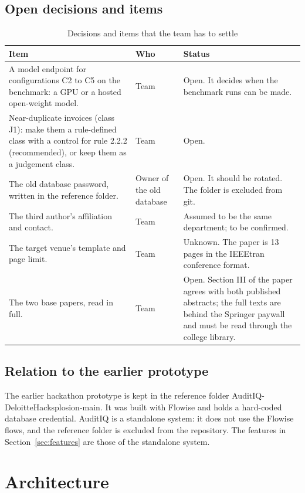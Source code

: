 \documentclass[11pt,a4paper]{article}
\begin{document}
\subsection{Open decisions and items}
\begin{table}[htbp]
\caption{Decisions and items that the team has to settle}
\label{tab:open}
\centering
\small
\begin{tabular}{L{6.2cm}L{3.0cm}L{6.1cm}}
\toprule
Item & Who & Status \\
\midrule
A model endpoint for configurations C2 to C5 on the benchmark: a GPU or a hosted open-weight model. & Team & Open. It decides when the benchmark runs can be made. \\
Near-duplicate invoices (class J1): make them a rule-defined class with a control for rule 2.2.2 (recommended), or keep them as a judgement class. & Team & Open. \\
The old database password, written in the reference folder. & Owner of the old database & Open. It should be rotated. The folder is excluded from git. \\
The third author's affiliation and contact. & Team & Assumed to be the same department; to be confirmed. \\
The target venue's template and page limit. & Team & Unknown. The paper is 13 pages in the IEEEtran conference format. \\
The two base papers, read in full. & Team & Open. Section III of the paper agrees with both published abstracts; the full texts are behind the Springer paywall and must be read through the college library. \\
\bottomrule
\end{tabular}
\end{table}

\subsection{Relation to the earlier prototype}
The earlier hackathon prototype is kept in the reference folder AuditIQ-DeloitteHacksplosion-main. It was built with Flowise and holds a hard-coded database credential. AuditIQ is a standalone system: it does not use the Flowise flows, and the reference folder is excluded from the repository. The features in Section~\ref{sec:features} are those of the standalone system.

\section{Architecture}
\label{sec:arch}
\end{document}
